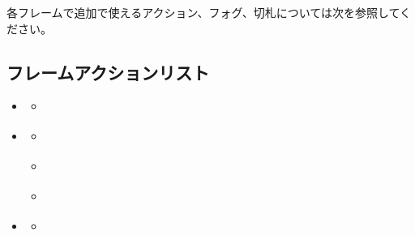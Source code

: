 \documentclass[letterpaper,10pt,dvipdfmx]{sphinxmanual}
\begin{document}
\sphinxAtStartPar
各フレームで追加で使えるアクション、フォグ、切札については次を参照してください。

\sphinxstepscope


\subsection{フレームアクションリスト}
\label{\detokenize{auto/frameActionlist:actionlist-act-frame}}\label{\detokenize{auto/frameActionlist:act-act-frame}}\label{\detokenize{auto/frameActionlist:id1}}\label{\detokenize{auto/frameActionlist::doc}}
\begin{sphinxShadowBox}
\begin{itemize}
\item {} 
\sphinxAtStartPar
{}\label{\detokenize{auto/frameActionlist:id175}}{\hyperref[\detokenize{auto/frameActionlist:id3}]{}}
\begin{itemize}
\item {} 
\sphinxAtStartPar
{}\label{\detokenize{auto/frameActionlist:id176}}{\hyperref[\detokenize{auto/frameActionlist:act-packopen}]{}}

\end{itemize}

\item {} 
\sphinxAtStartPar
{}\label{\detokenize{auto/frameActionlist:id177}}{\hyperref[\detokenize{auto/frameActionlist:id5}]{}}
\begin{itemize}
\item {} 
\sphinxAtStartPar
{}\label{\detokenize{auto/frameActionlist:id178}}{\hyperref[\detokenize{auto/frameActionlist:act-raredraw}]{}}

\item {} 
\sphinxAtStartPar
{}\label{\detokenize{auto/frameActionlist:id179}}{\hyperref[\detokenize{auto/frameActionlist:act-summonsrare}]{}}

\item {} 
\sphinxAtStartPar
{}\label{\detokenize{auto/frameActionlist:id180}}{\hyperref[\detokenize{auto/frameActionlist:act-trapcounter}]{}}

\end{itemize}

\item {} 
\sphinxAtStartPar
{}\label{\detokenize{auto/frameActionlist:id181}}{\hyperref[\detokenize{auto/frameActionlist:id9}]{}}
\begin{itemize}
\item {} 
\sphinxAtStartPar
{}\label{\detokenize{auto/frameActionlist:id182}}{\hyperref[\detokenize{auto/frameActionlist:act-open}]{}}


\end{itemize}
\end{itemize}
\end{sphinxShadowBox}
\end{document}
